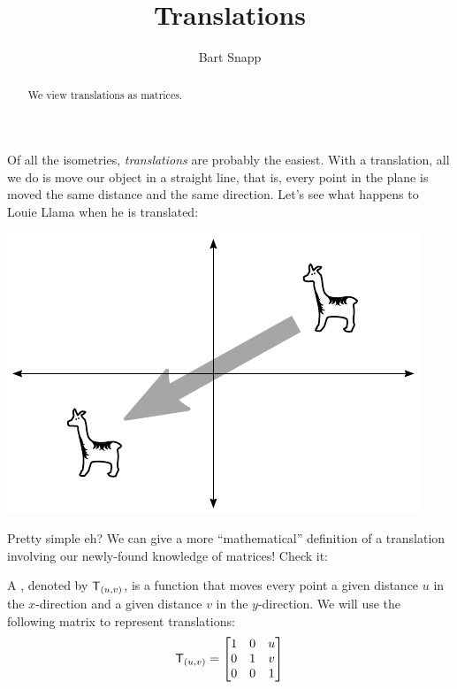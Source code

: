 \documentclass{ximera}
\author{Bart Snapp}
\title{Translations}
\begin{document}
\begin{abstract}
  We view translations as matrices.
\end{abstract}
\maketitle

Of all the isometries, \textit{translations} are probably the
easiest. With a translation, all we do is move our object in a
straight line, that is, every point in the plane is moved the same
distance and the same direction. Let's see what happens to Louie
Llama when he is translated:
\begin{image}
\includegraphics{transIdeaEg.pdf}
\end{image}

Pretty simple eh? We can give a more ``mathematical'' definition of a
translation involving our newly-found knowledge of matrices! Check it:

\begin{definition}
A , denoted by $\mathsf{T}_{(u,v)}$, is a function
that moves every point a given distance $u$ in the $x$-direction and a
given distance $v$ in the $y$-direction. We will use the following
matrix to represent translations:
\[
\mathsf{T}_{(u,v)} = 
\begin{bmatrix}
1 & 0 & u \\ 
0 & 1 & v \\
0 & 0 & 1
\end{bmatrix}
\]
\end{definition}
\end{document}
